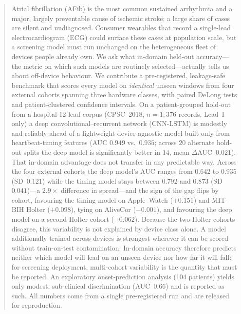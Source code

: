 \begin{abstract}
Atrial fibrillation (AFib) is the most common sustained arrhythmia and a major,
largely preventable cause of ischemic stroke; a large share of cases are silent
and undiagnosed. Consumer wearables that record a single-lead electrocardiogram
(ECG) could surface these cases at population scale, but a screening model must
run unchanged on the heterogeneous fleet of devices people already own. We ask
what in-domain held-out accuracy---the metric on which such models are routinely
selected---actually tells us about off-device behaviour. We contribute a
pre-registered, leakage-safe benchmark that scores every model on \emph{identical}
unseen windows from four external cohorts spanning three hardware classes, with
paired DeLong tests and patient-clustered confidence intervals. On a
patient-grouped hold-out from a hospital 12-lead corpus (CPSC~2018, $n{=}1{,}376$
records, Lead~I only) a deep convolutional--recurrent network (CNN-LSTM) is
modestly and reliably ahead of a lightweight device-agnostic model built only
from heartbeat-timing features (AUC $0.949$ vs.\ $0.935$; across $20$ alternate
hold-out splits the deep model is significantly better in $14$, mean
$\Delta$AUC~$0.021$). That in-domain advantage does not transfer in any
predictable way. Across the four external cohorts the deep model's AUC ranges
from $0.642$ to $0.935$ (SD~$0.121$) while the timing model stays between $0.792$
and $0.873$ (SD~$0.041$)---a $2.9\times$ difference in spread---and the sign of
the gap flips by cohort, favouring the timing model on Apple~Watch ($+0.151$) and
MIT-BIH Holter ($+0.098$), tying on AliveCor ($-0.001$), and favouring the deep
model on a second Holter cohort ($-0.062$). Because the two Holter cohorts
disagree, this variability is not explained by device class alone. A model
additionally trained across devices is strongest wherever it can be scored
without train-on-test contamination. In-domain accuracy therefore predicts
neither which model will lead on an unseen device nor how far it will fall: for
screening deployment, multi-cohort variability is the quantity that must be
reported. An exploratory onset-prediction analysis (104 patients) yields only
modest, sub-clinical discrimination (AUC~$0.66$) and is reported as such. All
numbers come from a single pre-registered run and are released for reproduction.
\end{abstract}

